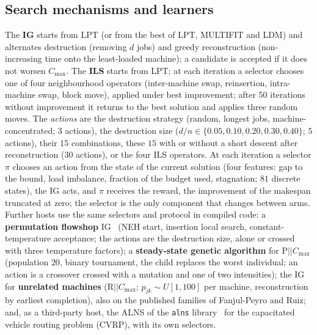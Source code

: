 \documentclass[conference,a4paper]{IEEEtran}
\newcommand{\Cmax}{C_{\max}}
\begin{document}
\subsection{Search mechanisms and learners}
\label{sec:learners}
The \textbf{IG} starts from LPT (or from the best of LPT, MULTIFIT and LDM) and alternates destruction (removing $d$ jobs) and greedy reconstruction (non-increasing time onto the least-loaded machine); a candidate is accepted if it does not worsen $\Cmax$.
The \textbf{ILS} starts from LPT; at each iteration a selector chooses one of four neighbourhood operators (inter-machine swap, reinsertion, intra-machine swap, block move), applied under best improvement; after $50$ iterations without improvement it returns to the best solution and applies three random moves.
The \emph{actions} are the destruction strategy (random, longest jobs, machine-concentrated; $3$ actions), the destruction size ($d/n\in\{0.05,0.10,0.20,0.30,0.40\}$; $5$ actions), their $15$ combinations, these $15$ with or without a short descent after reconstruction ($30$ actions), or the four ILS operators.
At each iteration a selector $\pi$ chooses an action from the state of the current solution (four features: gap to the bound, load imbalance, fraction of the budget used, stagnation; $81$ discrete states), the IG acts, and $\pi$ receives the reward, the improvement of the makespan truncated at zero; the selector is the only component that changes between arms.
Further hosts use the same selectors and protocol in compiled code: a \textbf{permutation flowshop} IG~\cite{RuizStutzle2007} (NEH start, insertion local search, constant-temperature acceptance; the actions are the destruction size, alone or crossed with three temperature factors); a \textbf{steady-state genetic algorithm} for P$||\Cmax$ (population $20$, binary tournament, the child replaces the worst individual; an action is a crossover crossed with a mutation and one of two intensities); the IG for \textbf{unrelated machines} (R$||\Cmax$; $p_{jk}\sim U[1,100]$ per machine, reconstruction by earliest completion), also on the published families of Fanjul-Peyro and Ruiz; and, as a third-party host, the ALNS of the \texttt{alns} library~\cite{WoudaLan2023} for the capacitated vehicle routing problem (CVRP), with its own selectors.
\end{document}
